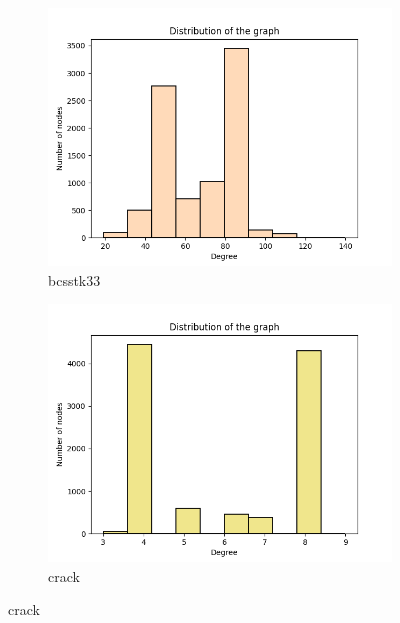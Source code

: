 \begin{figure}[h!]
\centering
\begin{subfigure}[b]{.35\textwidth}
  \centering
  \includegraphics[width=\linewidth]{small_graphs/bcsstk33.png}  
  \caption{bcsstk33}
  \label{fig:sub-first}
\end{subfigure}
\begin{subfigure}[b]{.35\textwidth}
  \centering
  \includegraphics[width=\linewidth]{small_graphs/crack.png}  
  \caption{crack}
  \label{fig:sub-second}
\end{subfigure}


\end{figure}
